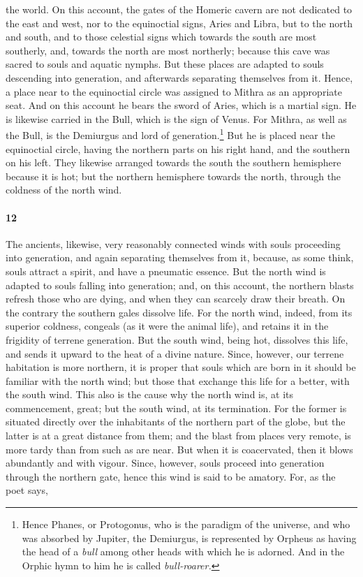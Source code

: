\documentclass[12pt]{article}
\begin{document}
the world. On this account, the gates of the Homeric cavern are not dedicated
to the east and west, nor to the equinoctial signs, Aries and Libra, but to the
north and south, and to those celestial signs which towards the south are most
southerly, and, towards the north are most northerly; because this cave was
sacred to souls and aquatic nymphs. But these places are adapted to souls
descending into generation, and afterwards separating themselves from it.
Hence, a place near to the equinoctial circle was assigned to Mithra as an
appropriate seat. And on this account he bears the sword of Aries, which is a
martial sign. He is likewise carried in the Bull, which is the sign of Venus.
For Mithra, as well as the Bull, is the Demiurgus and lord of
generation.\footnote{Hence Phanes, or Protogonus, who is the paradigm of the
universe, and who was absorbed by Jupiter, the Demiurgus, is represented by
Orpheus as having the head of a \textit{bull} among other heads with which he
is adorned. And in the Orphic hymn to him he is called \textit{bull-roarer.}}
But he is placed near the equinoctial circle, having the northern parts on his
right hand, and the southern on his left. They likewise arranged towards the
south the southern hemisphere because it is hot; but the northern hemisphere
towards the north, through the coldness of the north wind.


\paragraph{12} The ancients, likewise, very reasonably connected winds with
souls proceeding into generation, and again separating themselves from it,
because, as some think, souls attract a spirit, and have a pneumatic essence.
But the north wind is adapted to souls falling into generation; and, on this
account, the northern blasts refresh those who are dying, and when they can
scarcely draw their breath. On the contrary the southern gales dissolve life.
For the north wind, indeed, from its superior coldness, congeals (as it were
the animal life), and retains it in the frigidity of terrene generation. But
the south wind, being hot, dissolves this life, and sends it upward to the heat
of a divine nature. Since, however, our terrene habitation is more northern, it
is proper that souls which are born in it should be familiar with the north
wind; but those that exchange this life for a better, with the south wind. This
also is the cause why the north wind is, at its commencement, great; but the
south wind, at its termination. For the former is situated directly over the
inhabitants of the northern part of the globe, but the latter is at a great
distance from them; and the blast from places very remote, is more tardy than
from such as are near. But when it is coacervated, then it blows abundantly and
with vigour. Since, however, souls proceed into generation through the northern
gate, hence this wind is said to be amatory. For, as the poet says,
\end{document}
